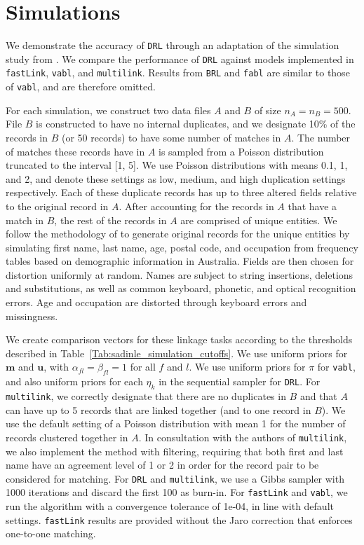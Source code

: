 \documentclass[12pt,letterpaper]{article}
\newcommand{\1}[1]{\mathbb{I}\!\left[#1\right]} %
\begin{document}
\section{Simulations}\label{sec:simulations}

We demonstrate the accuracy of \texttt{DRL} through an adaptation of the simulation study from \cite{aleshin2023multifile}. We compare the performance of \texttt{DRL} against models implemented in \texttt{fastLink}, \texttt{vabl}, and \texttt{multilink}. Results from \texttt{BRL} and \texttt{fabl} are similar to those of \texttt{vabl}, and are therefore omitted. 

For each simulation, we construct two data files $A$ and $B$ of size $n_A = n_B = 500$. File $B$ is constructed to have no internal duplicates, and we designate 10\% of the records in $B$ (or 50 records) to have some number of matches in $A$. The number of matches these records have in $A$ is sampled from a Poisson distribution truncated to the interval [1, 5]. We use Poisson distributions with means 0.1, 1, and 2, and denote these settings as low, medium, and high duplication settings respectively. Each of these duplicate records has up to three altered fields relative to the original record in $A$. After accounting for the records in $A$ that have a match in $B$, the rest of the records in $A$ are comprised of unique entities. We follow the methodology of \cite{christen_vatsalan2013} to generate original records for the unique entities by simulating first name, last name, age, postal code, and occupation from frequency tables based on demographic information in Australia. Fields are then chosen for distortion uniformly at random. Names are subject to string insertions, deletions and substitutions, as well as common keyboard, phonetic, and optical recognition errors. Age and occupation are distorted through keyboard errors and missingness.

We create comparison vectors for these linkage tasks according to the thresholds described in Table~\ref{Tab:sadinle_simulation_cutoffs}. We use uniform priors for $\bm{m}$ and $\bm{u}$, with $\alpha_{fl} = \beta_{fl} = 1$ for all $f$ and $l$. We use uniform priors for $\pi$ for \texttt{vabl}, and also uniform priors for each $\eta_k$ in the sequential sampler for \texttt{DRL}. For \texttt{multilink}, we correctly designate that there are no duplicates in $B$ and that $A$ can have up to 5 records that are linked together (and to one record in $B$). We use the default setting of a Poisson distribution with mean 1 for the number of records clustered together in $A$. In consultation with the authors of \texttt{multilink}, we also implement the method with filtering, requiring that both first and last name have an agreement level of 1 or 2 in order for the record pair to be considered for matching. For \texttt{DRL} and \texttt{multilink}, we use a Gibbs sampler with 1000 iterations and discard the first 100 as burn-in. For \texttt{fastLink} and \texttt{vabl}, we run the algorithm with a convergence tolerance of 1e-04, in line with default settings. \texttt{fastLink} results are provided without the Jaro correction that enforces one-to-one matching. 
\end{document}
